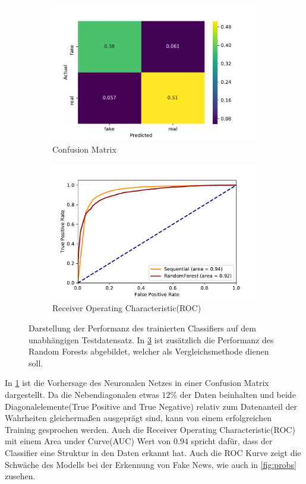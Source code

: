 \begin{figure}[t!]
    \centering
    \begin{subfigure}[t]{0.49\textwidth}
        \centering
        \includegraphics[width=\textwidth]{pictures/cnfsn_mtx_bow_best_nn.pdf}
        \caption{Confusion Matrix}
        \label{fig:CM}
    \end{subfigure}
    \begin{subfigure}[t]{0.49\textwidth}
        \centering
        \includegraphics[width=\textwidth]{pictures/roc_comparison.pdf}
        \caption{Receiver Operating Characteristic(ROC)}
        \label{fig:ROC}
    \end{subfigure}
    \caption{Darstellung der Performanz des trainierten Classifiers auf dem unabhängigen Testdatensatz. In \ref{fig:ROC}
            ist zusätzlich die Performanz des Random Forests abgebildet, welcher als Vergleichsmethode dienen soll.}
\end{figure}
In \ref{fig:CM} ist die Vorhersage des Neuronalen Netzes in einer Confusion Matrix dargestellt. 
Da die Nebendiagonalen etwas $12\%$ der Daten beinhalten und beide Diagonalelemente(True Positive and True Negative) 
relativ zum Datenanteil der Wahrheiten gleichermaßen ausgeprägt sind, kann von einem erfolgreichen Training gesprochen 
werden.
Auch die Receiver Operating Characteristic(ROC) mit einem Area under Curve(AUC) Wert von $0.94$ spricht dafür, dass 
der Classifier eine Struktur in den Daten erkannt hat.
Auch die ROC Kurve zeigt die Schwäche des Modells bei der Erkennung von Fake News, wie auch in \ref{fig:probs} zusehen.

